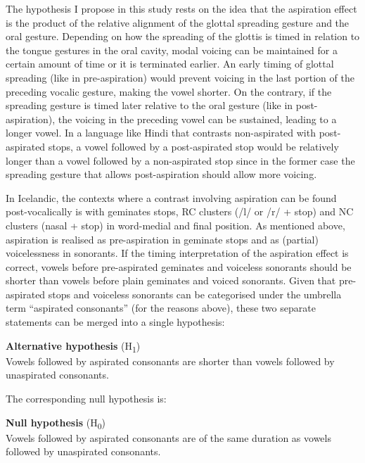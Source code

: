 \documentclass[11pt,a4paper,openany]{memoir}\usepackage[]{graphicx}\usepackage[]{color}
\begin{document}
The hypothesis I propose in this study rests on the idea that the aspiration effect is the product of the relative alignment of the glottal spreading gesture and the oral gesture.
Depending on how the spreading of the glottis is timed in relation to the tongue gestures in the oral cavity, modal voicing can be maintained for a certain amount of time or it is terminated earlier.
An early timing of glottal spreading (like in pre-aspiration) would prevent voicing in the last portion of the preceding vocalic gesture, making the vowel shorter.
On the contrary, if the spreading gesture is timed later relative to the oral gesture (like in post-aspiration), the voicing in the preceding vowel can be sustained, leading to a longer vowel.
In a language like Hindi that contrasts non-aspirated with post-aspirated stops, a vowel followed by a post-aspirated stop would be relatively longer than a vowel followed by a non-aspirated stop since in the former case the spreading gesture that allows post-aspiration should allow more voicing.

In Icelandic, the contexts where a contrast involving aspiration can be found post-vocalically is with geminates stops, RC clusters (/l/ or /r/ + stop) and NC clusters (nasal + stop) in word-medial and final position.
As mentioned above, aspiration is realised as pre-aspiration in geminate stops and as (partial) voicelessness in sonorants.
If the timing interpretation of the aspiration effect is correct, vowels before pre-aspirated geminates and voiceless sonorants should be shorter than vowels before plain geminates and voiced sonorants.
Given that pre-aspirated stops and voiceless sonorants can be categorised under the umbrella term ``aspirated consonants'' (for the reasons above), these two separate statements can be merged into a single hypothesis:

\begin{exe}
\ex\label{h1} \textbf{Alternative hypothesis} (H\textsubscript{1}) \\
Vowels followed by aspirated consonants are shorter than vowels followed by unaspirated consonants.
\end{exe}

The corresponding null hypothesis is:

\begin{exe}
\ex\label{h0} \textbf{Null hypothesis} (H\textsubscript{0}) \\
Vowels followed by aspirated consonants are of the same duration as vowels followed by unaspirated consonants.
\end{exe}
\end{document}
